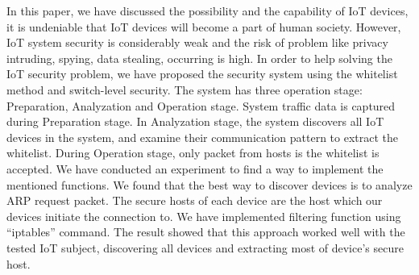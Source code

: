 In this paper, we have discussed the possibility and the capability of IoT devices, it is undeniable that IoT devices will become a part of human society. However, IoT system security is considerably weak and the risk of problem like privacy intruding, spying, data stealing, occurring is high. In order to help solving the IoT security problem, we have proposed the security system using the whitelist method and switch-level security. The system has three operation stage: Preparation, Analyzation and Operation stage. System traffic data is captured during Preparation stage. In Analyzation stage, the system discovers all IoT devices in the system, and examine their communication pattern to extract the whitelist. During Operation stage, only packet from hosts is the whitelist is accepted. We have conducted an experiment to find a way to implement the mentioned functions. We found that the best way to discover devices is to analyze ARP request packet. The secure hosts of each device are the host which our devices initiate the connection to. We have implemented filtering function using “iptables” command. The result showed that this approach worked well with the tested IoT subject, discovering all devices and extracting most of device’s secure host.  